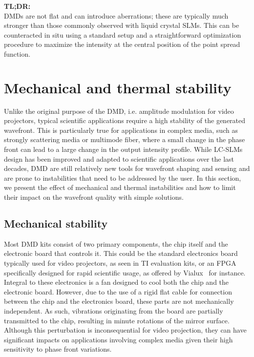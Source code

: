\documentclass[12pt]{iopart}
\begin{document}
\begin{tldr}
  \textbf{TL;DR:}\\
  DMDs are not flat and can introduce aberrations;
  these are typically much stronger than those commonly observed with liquid crystal SLMs.
  This can be counteracted in situ using a standard setup and a straightforward optimization procedure
  to maximize the intensity at the central position of the point spread function.
\end{tldr}


\section{Mechanical and thermal stability}

Unlike the original purpose of the DMD, i.e. amplitude modulation for video projectors,
typical scientific applications require a high stability of the generated wavefront.
This is particularly true for applications in complex media,
such as strongly scattering media or multimode fiber,
where a small change in the phase front can lead to a large change in the output intensity profile.
While LC-SLMs design has been improved and adapted to scientific applications
over the last decades,
DMD are still relatively new tools for wavefront shaping and sensing
and are prone to instabilities that need to be addressed by the user.
In this section, we present the effect of mechanical and thermal instabilities
and how to limit their impact on the wavefront quality with simple solutions.\\


\subsection{Mechanical stability}


Most DMD kits consist of two primary components,
the chip itself and the electronic board that controls it.
This could be the standard electronics board typically used for video projectors,
as seen in TI evaluation kits,
or an FPGA specifically designed for rapid scientific usage,
as offered by Vialux~\cite{vialux} for instance.
Integral to these electronics is a fan designed to cool both the chip and the electronic board.
However, due to the use of a rigid flat cable for connection between the chip and the electronics board,
these parts are not mechanically independent.
As such, vibrations originating from the board are partially transmitted to the chip,
resulting in minute rotations of the mirror surface.
Although this perturbation is inconsequential for video projection,
they can have significant impacts on applications involving complex media
given their high sensitivity to phase front variations.\\
\end{document}

